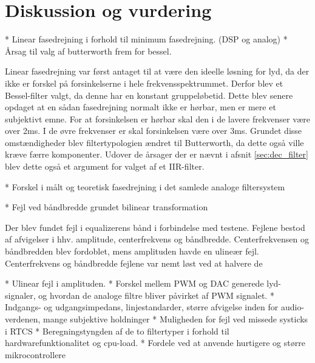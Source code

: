 \chapter{Diskussion og vurdering}\label{kap:diskussion}




* Linear fasedrejning i forhold til minimum fasedrejning. (DSP og analog)
* Årsag til valg af butterworth frem for bessel. 

Linear fasedrejning var først antaget til at være den ideelle løsning for lyd, da der ikke er forskel på forsinkelserne i hele frekvensspektrummet. Derfor blev et Bessel-filter valgt, da denne har en konstant gruppeløbetid. 
Dette blev senere opdaget at en sådan fasedrejning normalt ikke er hørbar, men er mere et subjektivt emne. 
For at forsinkelsen er hørbar skal den i de lavere frekvenser være over 2ms. 
I de øvre frekvenser er skal forsinkelsen være over 3ms.
Grundet disse omstændigheder blev filtertypologien ændret til Butterworth, da dette også ville kræve færre komponenter. 
Udover de årsager der er nævnt i afsnit \ref{sec:dec_filter} blev dette også et argument for valget af et IIR-filter. 


* Forskel i målt og teoretisk fasedrejning i det samlede analoge filtersystem



* Fejl ved båndbredde grundet bilinear transformation 

Der blev fundet fejl i equalizerens bånd i forbindelse med testene. Fejlene bestod af afvigelser i hhv. amplitude, centerfrekvens og båndbredde. Centerfrekvensen og båndbredden blev fordoblet, mens amplituden havde en ulineær fejl. Centerfrekvens og båndbredde fejlene var nemt løst ved at halvere de 

* Ulinear fejl i amplituden.
* Forskel mellem PWM og DAC generede lyd-signaler, og hvordan de analoge filtre bliver påvirket af PWM signalet.
* Indgangs- og udgangsimpedans, linjestandarder, større afvigelse inden for audio-verdenen, mange subjektive holdninger
* Muligheden for fejl ved missede systicks i RTCS
* Beregningstyngden af de to filtertyper i forhold til hardwarefunktionalitet og cpu-load. 
* Fordele ved at anvende hurtigere og større mikrocontrollere



